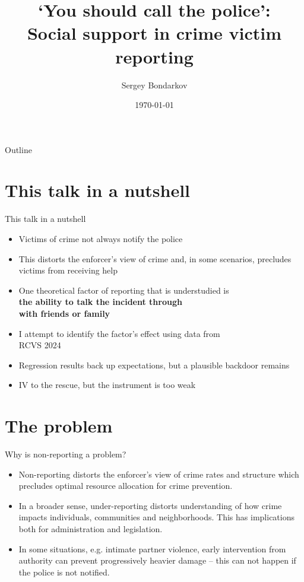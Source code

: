 \documentclass{beamer}
\title[Social support in victim crime reporting]{\textquoteleft You should call the police\textquoteright:\\Social support in crime victim reporting}
\author[Bondarkov]{Sergey Bondarkov}
\institute[IRL]{Institute for the Rule of Law, EUSPb}
\date{\today}
\begin{document}
\begin{frame}
	\titlepage
\end{frame}

\begin{frame}{Outline}
	\tableofcontents[hideallsubsections]
\end{frame}


\section{This talk in a nutshell}
\begin{frame}{This talk in a nutshell}
	\begin{itemize}
		\item Victims of crime not always notify the police
		\item This distorts the enforcer's view of crime and, in some scenarios, precludes victims from receiving help
		\item One theoretical factor of reporting that is understudied is\\ \textbf{the ability to talk the incident through\\with friends or family}
		\item I attempt to identify the factor's effect using data from\\RCVS 2024
		\item Regression results back up expectations, but a plausible backdoor remains
		\item IV to the rescue, but the instrument is too weak  
	\end{itemize}	
\end{frame}


\section{The problem}

\begin{frame}{Why is non-reporting a problem?}
	\begin{itemize}
		\item Non-reporting distorts the enforcer's view of crime rates and structure which precludes optimal resource allocation for crime prevention.
		\item In a broader sense, under-reporting distorts understanding of how crime impacts individuals, communities and neighborhoods. This has implications both for administration and legislation.
		\item In some situations, e.g. intimate partner violence, early intervention from authority can prevent progressively heavier damage -- this can not happen if the police is not notified.
	\end{itemize}
\end{frame}
\end{document}
